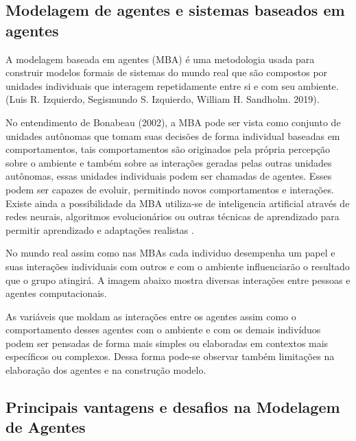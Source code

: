 \subsection{Modelagem de agentes e sistemas baseados em agentes}

A modelagem baseada em agentes (MBA) é uma metodologia usada para construir modelos formais de sistemas do mundo real que são compostos por unidades individuais que interagem repetidamente entre si e com seu ambiente.(Luis R. Izquierdo, Segismundo S. Izquierdo, William H. Sandholm. 2019)\cite{izquierdo2019introduction}. 

No entendimento de Bonabeau (2002), a MBA pode ser vista como conjunto de unidades autônomas que tomam suas decisões de forma individual baseadas em comportamentos, tais comportamentos são originados pela própria percepção sobre o ambiente e também sobre as interações geradas pelas outras unidades autônomas, essas unidades individuais podem ser chamadas de agentes. Esses podem ser capazes de evoluir, permitindo novos comportamentos e interações. Existe ainda a possibilidade da MBA utiliza-se de inteligencia artificial através de redes neurais, algoritmos evolucionários ou outras técnicas de aprendizado para permitir aprendizado e adaptações realistas \cite{bonabeau2002agent}. 

No mundo real assim como nas MBAs cada individuo desempenha um papel e suas interações individuais com outros e com o ambiente influenciarão o resultado que o grupo atingirá. A imagem abaixo mostra diversas interações entre pessoas e agentes computacionais.  




As variáveis que moldam as interações entre os agentes assim como o comportamento desses agentes com o ambiente e com os demais indivíduos podem ser pensadas de forma mais simples ou elaboradas em contextos mais específicos ou complexos. Dessa forma pode-se observar também limitações na elaboração dos agentes e na construção modelo.

\subsection{Principais vantagens e desafios na Modelagem de Agentes}

